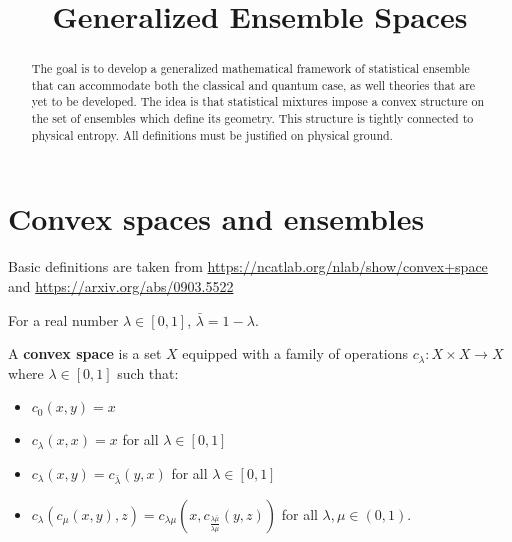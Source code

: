 \documentclass[11pt]{article}
\begin{document}
\title{Generalized Ensemble Spaces}

\maketitle

\begin{abstract}
The goal is to develop a generalized mathematical framework of statistical ensemble that can accommodate both the classical and quantum case, as well theories that are yet to be developed. The idea is that statistical mixtures impose a convex structure on the set of ensembles which define its geometry. This structure is tightly connected to physical entropy. All definitions must be justified on physical ground. 
\end{abstract}

\section{Convex spaces and ensembles}

\begin{remark}
	Basic definitions are taken from \url{https://ncatlab.org/nlab/show/convex+space} and \url{https://arxiv.org/abs/0903.5522}
\end{remark}

\begin{defn}
	For a real number $\lambda \in [0,1]$, $\bar{\lambda} = 1-\lambda$.
\end{defn}

\begin{defn}
	A \textbf{convex space} is a set $X$ equipped with a family of operations $c_\lambda : X \times X \to X$ where $\lambda \in [0,1]$ such that:
	\begin{itemize}
		\item $c_0(x,y)=x$
		\item $c_\lambda(x,x)=x$ for all $\lambda \in [0,1]$
		\item $c_\lambda(x,y)=c_{\bar{\lambda}}(y,x)$ for all $\lambda \in [0,1]$
		\item $c_\lambda(c_\mu(x,y), z)=c_{\lambda\mu}(x, c_{\frac{\lambda\bar{\mu}}{\overline{\lambda\mu}}}(y,z))$ for all $\lambda,\mu \in (0,1).$
	\end{itemize}
\end{defn}
\end{document}

